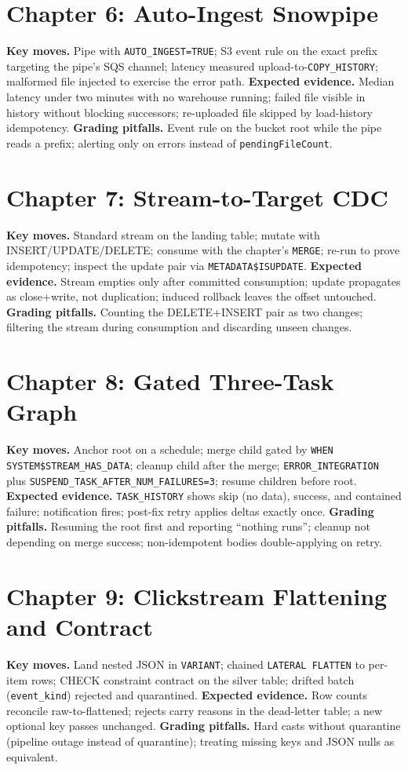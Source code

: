 \section{Chapter 6: Auto-Ingest Snowpipe}
\textbf{Key moves.} Pipe with \texttt{AUTO\_INGEST=TRUE}; S3 event rule on the exact prefix targeting the pipe's SQS channel; latency measured upload-to-\texttt{COPY\_HISTORY}; malformed file injected to exercise the error path.
\textbf{Expected evidence.} Median latency under two minutes with no warehouse running; failed file visible in history without blocking successors; re-uploaded file skipped by load-history idempotency.
\textbf{Grading pitfalls.} Event rule on the bucket root while the pipe reads a prefix; alerting only on errors instead of \texttt{pendingFileCount}.

\section{Chapter 7: Stream-to-Target CDC}
\textbf{Key moves.} Standard stream on the landing table; mutate with INSERT/UPDATE/DELETE; consume with the chapter's \texttt{MERGE}; re-run to prove idempotency; inspect the update pair via \texttt{METADATA\$ISUPDATE}.
\textbf{Expected evidence.} Stream empties only after committed consumption; update propagates as close+write, not duplication; induced rollback leaves the offset untouched.
\textbf{Grading pitfalls.} Counting the DELETE+INSERT pair as two changes; filtering the stream during consumption and discarding unseen changes.

\section{Chapter 8: Gated Three-Task Graph}
\textbf{Key moves.} Anchor root on a schedule; merge child gated by \texttt{WHEN SYSTEM\$STREAM\_HAS\_DATA}; cleanup child after the merge; \texttt{ERROR\_INTEGRATION} plus \texttt{SUSPEND\_TASK\_AFTER\_NUM\_FAILURES=3}; resume children before root.
\textbf{Expected evidence.} \texttt{TASK\_HISTORY} shows skip (no data), success, and contained failure; notification fires; post-fix retry applies deltas exactly once.
\textbf{Grading pitfalls.} Resuming the root first and reporting ``nothing runs''; cleanup not depending on merge success; non-idempotent bodies double-applying on retry.

\section{Chapter 9: Clickstream Flattening and Contract}
\textbf{Key moves.} Land nested JSON in \texttt{VARIANT}; chained \texttt{LATERAL FLATTEN} to per-item rows; CHECK constraint contract on the silver table; drifted batch (\texttt{event\_kind}) rejected and quarantined.
\textbf{Expected evidence.} Row counts reconcile raw-to-flattened; rejects carry reasons in the dead-letter table; a new optional key passes unchanged.
\textbf{Grading pitfalls.} Hard casts without quarantine (pipeline outage instead of quarantine); treating missing keys and JSON nulls as equivalent.

